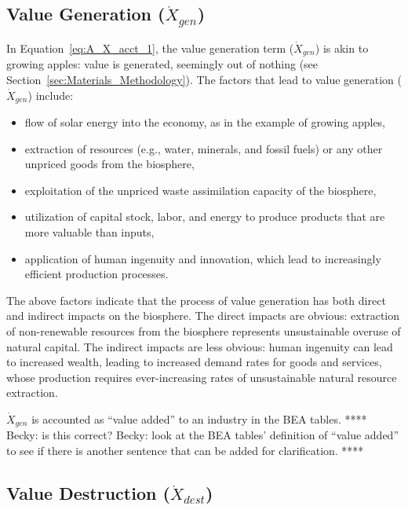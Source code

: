 \subsection{Value Generation ($\dot{X}_{gen}$)}

\noindent In Equation~\ref{eq:A_X_acct_1}, 
the value generation term ($\dot{X}_{gen}$) is akin to growing apples: 
value is generated, seemingly out of nothing
(see Section~\ref{sec:Materials_Methodology}).
The factors that lead to value generation 
($\dot{X}_{gen}$) include:

\begin{itemize}
	\item{flow of solar energy 
	into the economy,
	as in the example of growing apples,}
	\item{extraction of resources (e.g., water, minerals, and
	fossil fuels) or any other unpriced goods from the biosphere,}
	\item{exploitation of the unpriced waste assimilation capacity of the biosphere,}
	\item{utilization of capital stock, labor, and energy to produce products
	that are more valuable than inputs,}
	\item{application of human ingenuity 
	and innovation, 
	which lead to increasingly efficient production processes.}
\end{itemize}

The above factors indicate that the process of value generation
has both direct and indirect impacts on the biosphere.
The direct impacts are obvious: 
extraction of non-renewable resources from the biosphere 
represents unsustainable overuse of natural capital.
The indirect impacts are less obvious: 
human ingenuity can lead to increased wealth,
leading to increased demand rates for goods and services, 
whose production requires ever-increasing rates 
of unsustainable natural resource extraction.

$\dot{X}_{gen}$ is accounted as ``value added'' to an industry in the BEA tables.
**** Becky: is this correct? 
Becky: look at the BEA tables' definition of ``value added'' to 
see if there is another sentence that can be added for clarification. ****


\subsection{Value Destruction ($\dot{X}_{dest}$)}

